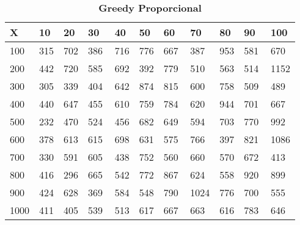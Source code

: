 \documentclass[10pt,letterpaper]{article}
\begin{document}
\begin{center}
\begin{table}\renewcommand{\arraystretch}{2.5}
\caption{\large \textbf{Greedy Proporcional}}
\centering
\begin{tabular} { |m{0.5cm}|m{1.3cm}|m{1.3cm}|m{1.3cm}|m{1.3cm}|m{1.3cm}|m{1.3cm}|m{1.3cm}|m{1.3cm}|m{1.3cm}|m{1.3cm}|} 
\hline
\rowcolor{Gray}
\centering \textbf{X} & \centering \textbf{10} & \centering \textbf{20} & \centering \textbf{30}\ & \centering \textbf{40} & \centering \textbf{50} & \centering \textbf{60}\ & \centering \textbf{70} & \centering \textbf{80} & \centering \textbf{90}\ & \textbf{100} \\\hline
\cellcolor{Gray}100 & \Large 315 & \Large 702 & \Large 386 & \Large 716 & \Large 776 & \Large 667 & \Large 387 & \Large 953 & \Large 581 & \Large 670 \\
\hline
\cellcolor{Gray}200 & \Large 442 & \Large 720 & \Large 585 & \Large 692 & \Large 392 & \Large 779 & \Large 510 & \Large 563 & \Large 514 & \Large 1152 \\
\hline
\cellcolor{Gray}300 & \Large 305 & \Large 339 & \Large 404 & \Large 642 & \Large 874 & \Large 815 & \Large 600 & \Large 758 & \Large 509 & \Large 489 \\
\hline
\cellcolor{Gray}400 & \Large 440 & \Large 647 & \Large 455 & \Large 610 & \Large 759 & \Large 784 & \Large 620 & \Large 944 & \Large 701 & \Large 667 \\
\hline
\cellcolor{Gray}500 & \Large 232 & \Large 470 & \Large 524 & \Large 456 & \Large 682 & \Large 649 & \Large 594 & \Large 703 & \Large 770 & \Large 992 \\
\hline
\cellcolor{Gray}600 & \Large 378 & \Large 613 & \Large 615 & \Large 698 & \Large 631 & \Large 575 & \Large 766 & \Large 397 & \Large 821 & \Large 1086 \\
\hline
\cellcolor{Gray}700 & \Large 330 & \Large 591 & \Large 605 & \Large 438 & \Large 752 & \Large 560 & \Large 660 & \Large 570 & \Large 672 & \Large 413 \\
\hline
\cellcolor{Gray}800 & \Large 416 & \Large 296 & \Large 665 & \Large 542 & \Large 772 & \Large 867 & \Large 624 & \Large 558 & \Large 920 & \Large 899 \\
\hline
\cellcolor{Gray}900 & \Large 424 & \Large 628 & \Large 369 & \Large 584 & \Large 548 & \Large 790 & \Large 1024 & \Large 776 & \Large 700 & \Large 555 \\
\hline
\cellcolor{Gray}1000 & \Large 411 & \Large 405 & \Large 539 & \Large 513 & \Large 617 & \Large 667 & \Large 663 & \Large 616 & \Large 783 & \Large 646 \\
\hline
\end{tabular} \\
\end{table}
\end{center}
\end{document}
